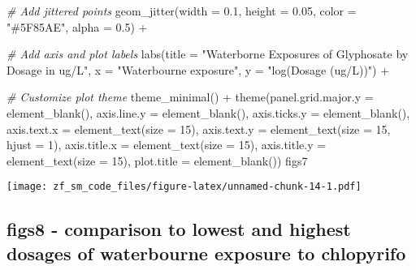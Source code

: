 \documentclass[
]{article}
\newenvironment{Shaded}{\begin{snugshade}}{\end{snugshade}}
\newcommand{\AttributeTok}[1]{\textcolor[rgb]{0.77,0.63,0.00}{#1}}
\newcommand{\CommentTok}[1]{\textcolor[rgb]{0.56,0.35,0.01}{\textit{#1}}}
\newcommand{\DecValTok}[1]{\textcolor[rgb]{0.00,0.00,0.81}{#1}}
\newcommand{\FloatTok}[1]{\textcolor[rgb]{0.00,0.00,0.81}{#1}}
\newcommand{\FunctionTok}[1]{\textcolor[rgb]{0.00,0.00,0.00}{#1}}
\newcommand{\NormalTok}[1]{#1}
\newcommand{\SpecialCharTok}[1]{\textcolor[rgb]{0.00,0.00,0.00}{#1}}
\newcommand{\StringTok}[1]{\textcolor[rgb]{0.31,0.60,0.02}{#1}}
\begin{document}
\begin{Shaded}
\begin{Highlighting}[]
  \CommentTok{\# Add jittered points}
  \FunctionTok{geom\_jitter}\NormalTok{(}\AttributeTok{width =} \FloatTok{0.1}\NormalTok{, }\AttributeTok{height =} \FloatTok{0.05}\NormalTok{, }\AttributeTok{color =} \StringTok{"\#5F85AE"}\NormalTok{, }\AttributeTok{alpha =} \FloatTok{0.5}\NormalTok{) }\SpecialCharTok{+}
  
  \CommentTok{\# Add axis and plot labels}
  \FunctionTok{labs}\NormalTok{(}\AttributeTok{title =} \StringTok{"Waterborne Exposures of Glyphosate by Dosage in ug/L"}\NormalTok{, }\AttributeTok{x =} \StringTok{"Waterbourne exposure"}\NormalTok{, }\AttributeTok{y =} \StringTok{"log(Dosage (ug/L))"}\NormalTok{)  }\SpecialCharTok{+}
  
  \CommentTok{\# Customize plot theme}
  \FunctionTok{theme\_minimal}\NormalTok{() }\SpecialCharTok{+}
  \FunctionTok{theme}\NormalTok{(}\AttributeTok{panel.grid.major.y =} \FunctionTok{element\_blank}\NormalTok{(),}
    \AttributeTok{axis.line.y =} \FunctionTok{element\_blank}\NormalTok{(),}
    \AttributeTok{axis.ticks.y =} \FunctionTok{element\_blank}\NormalTok{(),}
    \AttributeTok{axis.text.x =} \FunctionTok{element\_text}\NormalTok{(}\AttributeTok{size =} \DecValTok{15}\NormalTok{),}
    \AttributeTok{axis.text.y =} \FunctionTok{element\_text}\NormalTok{(}\AttributeTok{size =} \DecValTok{15}\NormalTok{, }\AttributeTok{hjust =} \DecValTok{1}\NormalTok{),}
    \AttributeTok{axis.title.x =} \FunctionTok{element\_text}\NormalTok{(}\AttributeTok{size =} \DecValTok{15}\NormalTok{),}
    \AttributeTok{axis.title.y =} \FunctionTok{element\_text}\NormalTok{(}\AttributeTok{size =} \DecValTok{15}\NormalTok{),}
    \AttributeTok{plot.title =} \FunctionTok{element\_blank}\NormalTok{())}
\NormalTok{figs7}
\end{Highlighting}
\end{Shaded}

\texttt{[image: zf\_sm\_code\_files/figure-latex/unnamed-chunk-14-1.pdf]}

\hypertarget{figs8---comparison-to-lowest-and-highest-dosages-of-waterbourne-exposure-to-chlopyrifo}{%
\subsection{figs8 - comparison to lowest and highest dosages of
waterbourne exposure to
chlopyrifo}\label{figs8---comparison-to-lowest-and-highest-dosages-of-waterbourne-exposure-to-chlopyrifo}}
\end{document}
